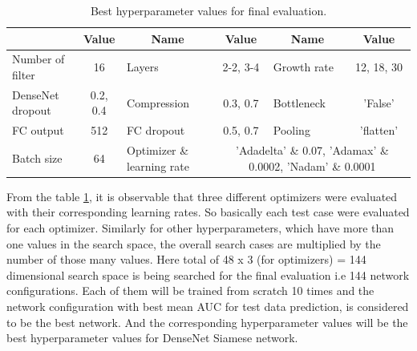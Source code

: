 \begin{table}[ht]
\centering
\caption{Best hyperparameter values for final evaluation.}
\resizebox{\textwidth}{!}
{\begin{tabular}{|l c| l c| l c|} 
 \hline\hline
 \rowcolor{lightgrey}
 \multicolumn{1}{|c}{\textbf{Name}} & \multicolumn{1}{c|}{\textbf{Value}} & \multicolumn{1}{c}{\textbf{Name}} & \multicolumn{1}{c|}{\textbf{Value}} & \multicolumn{1}{c}{\textbf{Name}} & \multicolumn{1}{c|}{\textbf{Value}} \\ [0.5ex] 
 \hline
 Number of filter & 16 & Layers & 2-2, 3-4 & Growth rate & 12, 18, 30\\
 \hline
 DenseNet dropout & 0.2, 0.4 & Compression & 0.3, 0.7 & Bottleneck & 'False'\\
 \hline
 FC output &  512 & FC dropout & 0.5, 0.7 & Pooling & 'flatten' \\
 \hline
 Batch size & 64 & Optimizer \& learning rate & \multicolumn{3}{c|}{'Adadelta' \& 0.07, 'Adamax' \& 0.0002, 'Nadam' \& 0.0001} \\
 \hline \hline
\end{tabular}}
\label{table:final_run_search_space}
\end{table}

From the table \ref{table:final_run_search_space}, it is observable that three different optimizers were evaluated with their corresponding learning rates. So basically each test case were evaluated for each optimizer.
Similarly for other hyperparameters, which have more than one values in the search space, the overall search cases are multiplied by the number of those many values. Here total of 48 x 3 (for optimizers) = 144 dimensional search space is 
being searched for the final evaluation i.e 144 network configurations. Each of them will be trained from scratch 10 times and the network configuration with best mean AUC for test data prediction, is considered to be the best network. 
And the corresponding hyperparameter values will be the best hyperparameter values for DenseNet Siamese network.


